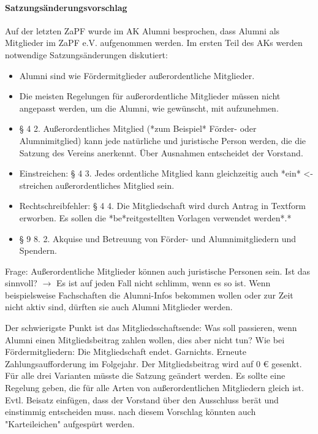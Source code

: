 \paragraph{Satzungsänderungsvorschlag}
Auf der letzten ZaPF wurde im AK Alumni besprochen, dass Alumni als Mitglieder im ZaPF e.V. aufgenommen werden. Im ersten Teil des AKs werden notwendige Satzungsänderungen diskutiert:
\begin{itemize}
\item Alumni sind wie Fördermitglieder außerordentliche Mitglieder.
\item Die meisten Regelungen für außerordentliche Mitglieder müssen nicht angepasst werden, um die Alumni, wie gewünscht, mit aufzunehmen.
        \item § 4 2. Außerordentliches Mitglied (*zum Beispiel* Förder- oder Alumnimitglied) kann jede natürliche und juristische Person werden, die die Satzung des Vereins anerkennt. Über Ausnahmen entscheidet der Vorstand.
        \item \flqq Ein\frqq streichen: § 4 3. Jedes ordentliche Mitglied kann gleichzeitig auch *ein* <- streichen außerordentliches Mitglied sein.
        \item Rechtschreibfehler: § 4 4. Die Mitgliedschaft wird durch Antrag in Textform erworben. Es sollen die *be*reitgestellten Vorlagen verwendet werden*.*
        \item § 9 8. 2. Akquise und Betreuung von Förder- und Alumnimitgliedern und Spendern.
      \end{itemize}
      Frage: Außerordentliche Mitglieder können auch juristische Personen sein. Ist das sinnvoll? $\rightarrow$ Es ist auf jeden Fall nicht schlimm, wenn es so ist. Wenn beispielsweise Fachschaften die Alumni-Infos bekommen wollen oder zur Zeit nicht aktiv sind, dürften sie auch Alumni Mitglieder werden.
      \begin{outline}
        \1 Der schwierigste Punkt ist das Mitgliedsschaftsende:
        \2 Was soll passieren, wenn Alumni einen Mitgliedsbeitrag zahlen wollen, dies aber nicht tun?
        \3 Wie bei Fördermitgliedern: Die Mitgliedschaft endet.
        \3 Garnichts. Erneute Zahlungsaufforderung im Folgejahr.
        \3 Der Mitgliedsbeitrag wird auf 0 € gesenkt.
        \2 Für alle drei Varianten müsste die Satzung geändert werden.
        \2 Es sollte eine Regelung geben, die für alle Arten von außerordentlichen Mitgliedern gleich ist. Evtl. Beisatz einfügen, dass der Vorstand über den Ausschluss berät und einstimmig entscheiden muss. nach diesem Vorschlag könnten auch "Karteileichen" aufgespürt werden.
      \end{outline}
